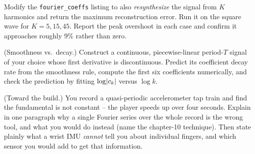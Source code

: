 \begin{exercise}
Modify the \texttt{fourier\_coeffs} listing to also \emph{resynthesize} the signal from
\(K\) harmonics and return the maximum reconstruction error. Run it on the square wave for
\(K=5,15,45\). Report the peak overshoot in each case and confirm it approaches roughly
\(9\%\) rather than zero.
\end{exercise}

\begin{exercise}
(Smoothness vs.\ decay.) Construct a continuous, piecewise-linear period-\(T\) signal of
your choice whose first derivative is discontinuous. Predict its coefficient decay rate
from the smoothness rule, compute the first six coefficients numerically, and check the
prediction by fitting \(\log\lvert c_k\rvert\) versus \(\log k\).
\end{exercise}

\begin{exercise}
(Toward the build.) You record a quasi-periodic accelerometer tap train and find the
fundamental is not constant -- the player speeds up over four seconds. Explain in one
paragraph why a single Fourier series over the whole record is the wrong tool, and what you
would do instead (name the chapter-10 technique). Then state plainly what a wrist IMU
\emph{cannot} tell you about individual fingers, and which sensor you would add to get that
information.
\end{exercise}
